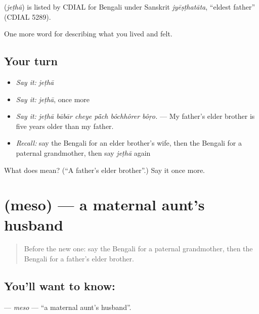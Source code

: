 \begin{cousinweb}
\textbf{} (\emph{jeṭhā}) is listed by CDIAL for Bengali under Sanskrit \emph{jyēṣṭhatāta}, \textquotedblleft{}eldest father\textquotedblright{} (CDIAL 5289).
\end{cousinweb}

\begin{grammarlens}[title={What you've built}]
One more word for describing what you lived and felt.
\end{grammarlens}

\subsection*{Your turn}
\begin{itemize}
\raggedright
  \item \emph{Say it:} \emph{jeṭhā}
  \item \emph{Say it:} \emph{jeṭhā}, once more
  \item \emph{Say it:} \emph{jeṭhā bābār cheye pā̃ch bôchhôrer bôṛo.} — My father's elder brother is five years older than my father.
  \item \emph{Recall:} say the Bengali for an elder brother's wife, then the Bengali for a paternal grandmother, then say \emph{jeṭhā} again
\end{itemize}

\begin{tcolorbox}[breakable,colback=teal!4,colframe=teal!35!black,title={Before you move on}]
What does  mean? (\textquotedblleft{}A father's elder brother\textquotedblright{}.) Say it once more.
\end{tcolorbox}
\section[\texorpdfstring{\bn{মেসো} (meso)}{মেসো (meso)}]{ (meso) — a maternal aunt's husband}

\label{lesson:BN-C482-meso}



\begin{quote}
Before the new one: say the Bengali for a paternal grandmother, then the Bengali for a father's elder brother.
\end{quote}

\subsection*{You'll want to know: }
\textbf{} — \emph{meso} — \textquotedblleft{}a maternal aunt's husband\textquotedblright{}.

